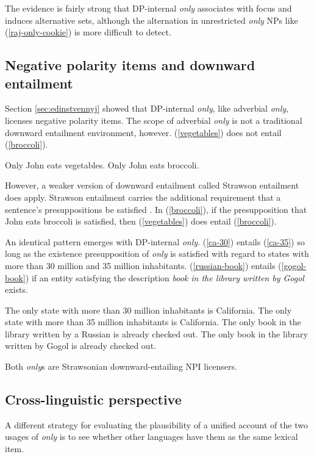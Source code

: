 The evidence is fairly strong that DP-internal \textit{only} associates with focus and induces alternative sets, although the alternation in unrestricted \textit{only} NPs like (\ref{raj-only-cookie}) is more difficult to detect.

\subsection{Negative polarity items and downward entailment}
Section \ref{sec:edinstvennyj} showed that DP-internal \textit{only}, like adverbial \textit{only}, licenses negative polarity items. The scope of adverbial \textit{only} is not a traditional downward entailment environment, however. (\ref{vegetables}) does not entail (\ref{broccoli}).

\begin{exe}
	\ex \label{vegetables} Only John eats vegetables.
	\ex \label{broccoli} Only John eats broccoli.
\end{exe}

However, a weaker version of downward entailment called Strawson entailment does apply. Strawson entailment carries the additional requirement that a sentence's presuppositions be satisfied \citep{fintel99}. In (\ref{broccoli}), if the presupposition that John eats broccoli is satisfied, then (\ref{vegetables}) does entail (\ref{broccoli}).

An identical pattern emerges with DP-internal \textit{only}. (\ref{ca-30}) entails (\ref{ca-35}) so long as the existence presupposition of \textit{only} is satisfied with regard to states with more than 30 million and 35 million inhabitants. (\ref{russian-book}) entails (\ref{gogol-book}) if an entity satisfying the description \textit{book in the library written by Gogol} exists.

\begin{exe}
	\ex \label{ca-30} The only state with more than 30 million inhabitants is California.
	\ex \label{ca-35} The only state with more than 35 million inhabitants is California.
	\ex \label{russian-book} The only book in the library written by a Russian is already checked out.
	\ex \label{gogol-book} The only book in the library written by Gogol is already checked out.
\end{exe}

Both \textit{only}s are Strawsonian downward-entailing NPI licensers.

\subsection{Cross-linguistic perspective}
A different strategy for evaluating the plausibility of a unified account of the two usages of \textit{only} is to see whether other languages have them as the same lexical item.

